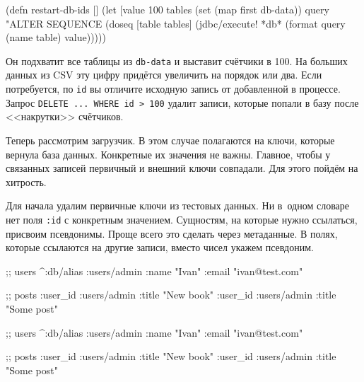 \else

\begin{english}
  \begin{clojure}
(defn restart-db-ids []
  (let [value 100
        tables (set (map first db-data))
        query "ALTER SEQUENCE %
    (doseq [table tables]
      (jdbc/execute! *db* (format query (name table) value)))))
  \end{clojure}
\end{english}

\fi

Он подхватит все таблицы из \verb|db-data| и выставит счётчики в 100. На
больших данных из CSV эту цифру придётся увеличить на порядок или два. Если
потребуется, по \verb|id| вы отличите исходную запись от добавленной в
процессе. Запрос \verb|DELETE ... WHERE id > 100| удалит записи, которые
попали в базу после <<накрутки>> счётчиков.

Теперь рассмотрим загрузчик. В этом случае полагаются на ключи, которые вернула
база данных. Конкретные их значения не важны. Главное, чтобы у связанных записей
первичный и внешний ключи совпадали. Для этого пойдём на хитрость.

Для начала удалим первичные ключи из тестовых данных. Ни в~одном словаре нет
поля \verb|:id| с конкретным значением. Сущностям, на которые нужно ссылаться,
присвоим псевдонимы. Проще всего это сделать через метаданные. В полях, которые
ссылаются на другие записи, вместо чисел укажем псевдоним.


\ifx\devicetype\mobile

\begin{english}
  \begin{clojure}
;; users
^{:db/alias :users/admin}
 {:name "Ivan" :email "ivan@test.com"}

;; posts
{:user_id :users/admin
 :title "New book"}
{:user_id :users/admin
 :title "Some post"}
  \end{clojure}
\end{english}

\else

\begin{english}
  \begin{clojure}
;; users
^{:db/alias :users/admin}
 {:name "Ivan" :email "ivan@test.com"}

;; posts
{:user_id :users/admin :title "New book"}
{:user_id :users/admin :title "Some post"}
  \end{clojure}
\end{english}

